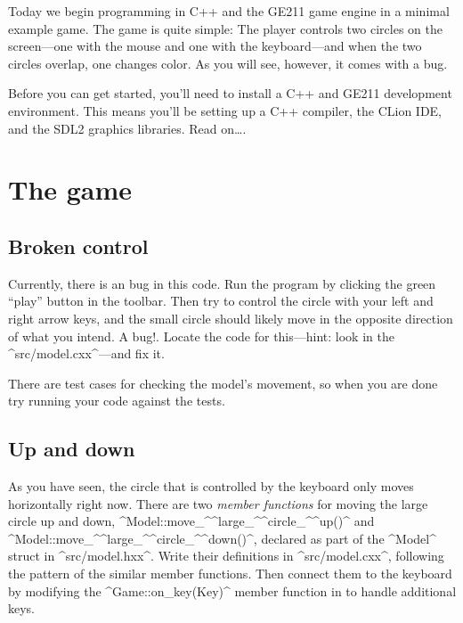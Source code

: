 \documentclass{tufte-handout}
\begin{document}
\maketitle

Today we begin programming in C++ and the GE211 game engine in a minimal
example game. The game is quite simple: The player controls two circles
on the screen---one with the mouse and one with the keyboard---and when
the two circles overlap, one changes color. As you will see, however, it
comes with a bug.

Before you can get started, you’ll need to install a C++ and GE211
development environment. This means you’ll be setting up a C++ compiler,
the CLion IDE, and the SDL2 graphics libraries. Read on\ldots.

\CxxPrelims*

\section{The game}

\subsection{Broken control}

Currently, there is an bug in this code. Run the program by clicking the
green “play” button in the toolbar. Then try to control the circle with
your left and right arrow keys, and the small circle should likely move
in the opposite direction of what you intend. A bug!. Locate the code
for this---hint: look in the ^src/model.cxx^---and fix it.

There are test cases for checking the model's movement, so when you are
done try running your code against the tests.

\subsection{Up and down}

As you have seen, the circle that is controlled by the keyboard only
moves horizontally right now. There are two \emph{member functions} for
moving the large circle up and down,
^Model::move_^\-^large_^\-^circle_^\-^up()^ and
^Model::move_^\-^large_^\-^circle_^\-^down()^, declared as part of the
^Model^ struct in ^src/model.hxx^. Write their definitions in
^src/model.cxx^, following the pattern of the similar member functions.
Then connect them to the keyboard by modifying the ^Game::on_key(Key)^
member function in  to handle additional keys.
\end{document}
